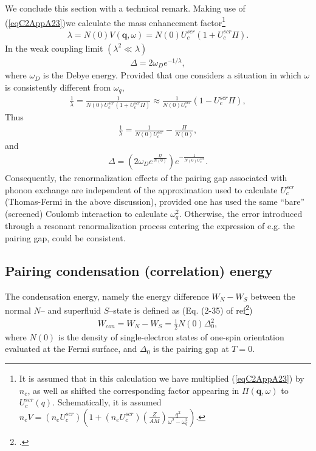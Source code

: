 We conclude this section with a technical remark. Making use of (\ref{eqC2AppA23})we calculate the mass enhancement factor\footnote{It is assumed that in this calculation we have multiplied (\ref{eqC2AppA23}) by $n_e$, as well as shifted the corresponding factor appearing in $\Pi(\mathbf q, \omega)$ to $U_c^{scr}(q)$. Schematically, it is assumed $n_eV=(n_e U_c^{scr})\left(1+(n_e U_c^{scr})\left(\frac{Z}{AM}\right)\frac{q^2}{\omega^2-\omega_q^2}\right)$.}
\begin{align}\label{eqC2AppA25}
\lambda=N(0)V(\mathbf q,\omega)=N(0)U^{scr}_c\left(1+U^{scr}_c\Pi\right).
\end{align}
In the weak coupling limit $(\lambda^2\ll\lambda)$
\begin{align}\label{eqC2AppA26}
\Delta=2\omega_De^{-1/\lambda},
\end{align}
where $\omega_D$ is the Debye energy.
  Provided that one considers  a situation in which $\omega$ is consistently different from $\omega_q$,
\begin{align}\label{eqC2AppA28}
\frac{1}{\lambda}=\frac{1}{N(0)U^{scr}_c\left(1+U^{scr}_c\Pi\right)}\approx\frac{1}{N(0)U^{scr}_c}\left(1-U^{scr}_c\Pi\right),
\end{align}
Thus
\begin{align}\label{eqC2AppA29}
\frac{1}{\lambda}=\frac{1}{N(0)U^{scr}_c}-\frac{\Pi}{N(0)},
\end{align}
and
\begin{align}\label{eqC2AppA30}
\Delta=\left(2\omega_De^{\frac{\Pi}{N(0)}}\right)e^{-\frac{1}{N(0)U^{scr}_c}}.
\end{align}
 Consequently, the renormalization effects of the pairing gap associated with phonon exchange are independent of the approximation used to calculate $U^{scr}_c$ (Thomas-Fermi in the above discussion), provided one has used the same ``bare'' (screened) Coulomb interaction to calculate $\omega^2_q$.   Otherwise, the error introduced through a resonant renormalization process entering the expression of e.g. the pairing gap, could be consistent.
\subsection{Pairing condensation (correlation) energy}\label{S4.8.4}
The condensation energy, namely the energy difference $W_N-W_S$ between the normal $N$-- and superfluid $S$--state is defined as (Eq. (2-35) of ref\footnote{\label{foot1}\cite{Schrieffer:64}.})
\begin{align}\label{eqC3AppA1}
W_{con}=W_N-W_S=\frac{1}{2}N(0)\Delta_0^2,
\end{align}
where $N(0)$ is the density of single-electron states of one-spin orientation evaluated at the Fermi surface, and $\Delta_0$ is the pairing gap at $T=0$.


